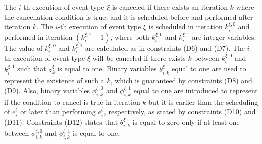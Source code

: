 \documentclass[]{interact}
\theoremstyle{plain}%
\theoremstyle{definition}
\theoremstyle{remark}
\begin{document}
The $i$-th execution of event type ${\xi}$ is canceled if there exists an iteration $k$ where the cancellation condition is true, and it is scheduled before and performed after iteration $k$.
The $i$-th execution of event type ${\xi}$ is scheduled in iteration $k^{\xi,0}_i$ and performed in iteration $(k^{\xi,1}_i-1)$, where both $k^{\xi,0}_i$ and $k^{\xi,1}_i$ are integer variables. 
The value of $k^{\xi,0}_i$ and $k^{\xi,1}_i$ are calculated as in constraints (D6) and (D7). The $i$-th execution of event type ${\xi}$ will be canceled if there exists $k$ between $k^{\xi,0}_i$ and $k^{\xi,1}_i$ such that $z^{\bar{\xi}}_{k}$ is equal to one. Binary variables $\theta^{\xi}_{i,k}$ equal to one are used to represent the existence of such a $k$, which is guaranteed by constraints (D8) and (D9). Also, binary variables $\phi^{\xi,0}_{i,k}$ and $\phi^{\xi,1}_{i,k}$ equal to one are introduced to represent if the condition to cancel is true in iteration $k$ but it is earlier than the scheduling of $e^{\xi}_{i}$ or later than performing $e^{\xi}_{i}$, respectively, as stated by constraints (D10) and (D11). Constraints (D12) states that $\theta^{\xi}_{i,k}$ is equal to zero only if at least one between $\phi^{\xi,0}_{i,k}$ and $\phi^{\xi,1}_{i,k}$ is equal to one. 
\end{document}
